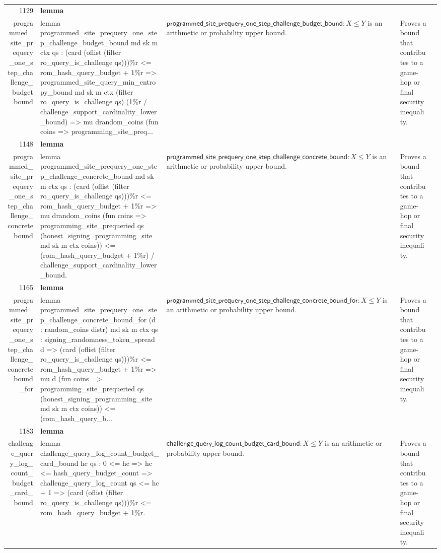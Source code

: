 \documentclass[10pt]{article}
\newcommand{\ec}[1]{\begingroup\ttfamily\scriptsize #1\endgroup}
\begin{document}
\begin{longtable}{r L{0.17\textwidth} L{0.26\textwidth} L{0.27\textwidth} L{0.20\textwidth}}
1129 & \textbf{lemma}\\\ec{programmed\_site\_prequery\_one\_step\_challenge\_budget\_bound} & \ec{lemma programmed\_site\_prequery\_one\_step\_challenge\_budget\_bound md sk m ctx qs : (card (oflist (filter ro\_query\_is\_challenge qs)))\%r <= rom\_hash\_query\_budget + 1\%r => programmed\_site\_query\_min\_entropy\_bound md sk m ctx (filter ro\_query\_is\_challenge qs) (1\%r / challenge\_support\_cardinality\_lower\_bound) => mu drandom\_coins (fun coins => programming\_site\_preq...} & \(\mathsf{programmed\_site\_prequery\_one\_step\_challenge\_budget\_bound} : X \le Y\) is an arithmetic or probability upper bound. & Proves a bound that contributes to a game-hop or final security inequality. \\
1148 & \textbf{lemma}\\\ec{programmed\_site\_prequery\_one\_step\_challenge\_concrete\_bound} & \ec{lemma programmed\_site\_prequery\_one\_step\_challenge\_concrete\_bound md sk m ctx qs : (card (oflist (filter ro\_query\_is\_challenge qs)))\%r <= rom\_hash\_query\_budget + 1\%r => mu drandom\_coins (fun coins => programming\_site\_prequeried qs (honest\_signing\_programming\_site md sk m ctx coins)) <= (rom\_hash\_query\_budget + 1\%r) / challenge\_support\_cardinality\_lower\_bound.} & \(\mathsf{programmed\_site\_prequery\_one\_step\_challenge\_concrete\_bound} : X \le Y\) is an arithmetic or probability upper bound. & Proves a bound that contributes to a game-hop or final security inequality. \\
1165 & \textbf{lemma}\\\ec{programmed\_site\_prequery\_one\_step\_challenge\_concrete\_bound\_for} & \ec{lemma programmed\_site\_prequery\_one\_step\_challenge\_concrete\_bound\_for (d : random\_coins distr) md sk m ctx qs : signing\_randomness\_token\_spread d => (card (oflist (filter ro\_query\_is\_challenge qs)))\%r <= rom\_hash\_query\_budget + 1\%r => mu d (fun coins => programming\_site\_prequeried qs (honest\_signing\_programming\_site md sk m ctx coins)) <= (rom\_hash\_query\_b...} & \(\mathsf{programmed\_site\_prequery\_one\_step\_challenge\_concrete\_bound\_for} : X \le Y\) is an arithmetic or probability upper bound. & Proves a bound that contributes to a game-hop or final security inequality. \\
1183 & \textbf{lemma}\\\ec{challenge\_query\_log\_count\_budget\_card\_bound} & \ec{lemma challenge\_query\_log\_count\_budget\_card\_bound hc qs : 0 <= hc => hc <= hash\_query\_budget\_count => challenge\_query\_log\_count qs <= hc + 1 => (card (oflist (filter ro\_query\_is\_challenge qs)))\%r <= rom\_hash\_query\_budget + 1\%r.} & \(\mathsf{challenge\_query\_log\_count\_budget\_card\_bound} : X \le Y\) is an arithmetic or probability upper bound. & Proves a bound that contributes to a game-hop or final security inequality. \\

\end{longtable}
\end{document}

